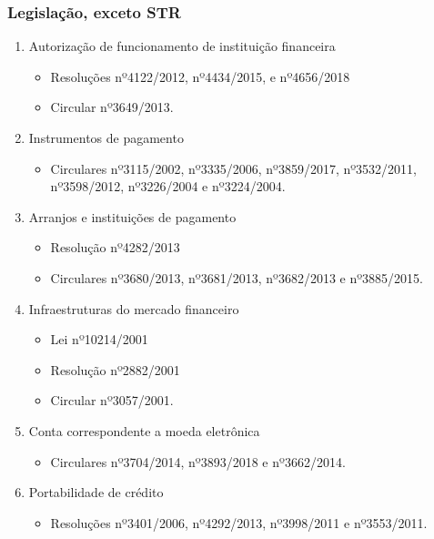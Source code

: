 \documentclass[10pt]{beamer}
\begin{document}
\begin{frame} 
\frametitle{Legislação, exceto STR}

\begin{enumerate}		
\item Autorização de funcionamento de instituição financeira
\begin{itemize}	
\item Resoluções nº4122/2012, nº4434/2015, e nº4656/2018
\item Circular nº3649/2013.
\end{itemize}
\item Instrumentos de pagamento
\begin{itemize}
\item Circulares nº3115/2002, nº3335/2006, nº3859/2017, nº3532/2011, nº3598/2012, nº3226/2004 e nº3224/2004.
\end{itemize}
\item Arranjos e instituições de pagamento
\begin{itemize}
\item Resolução nº4282/2013
\item Circulares nº3680/2013, nº3681/2013, nº3682/2013 e nº3885/2015.
\end{itemize}
\item Infraestruturas do mercado financeiro
\begin{itemize}
\item Lei nº10214/2001
\item Resolução nº2882/2001
\item Circular nº3057/2001.
\end{itemize}
\item Conta correspondente a moeda eletrônica
\begin{itemize}
\item Circulares nº3704/2014, nº3893/2018 e nº3662/2014.
\end{itemize}
\item Portabilidade de crédito
\begin{itemize}
\item Resoluções nº3401/2006, nº4292/2013, nº3998/2011 e nº3553/2011.
\end{itemize}
\end{enumerate}

\end{frame}
\end{document}
